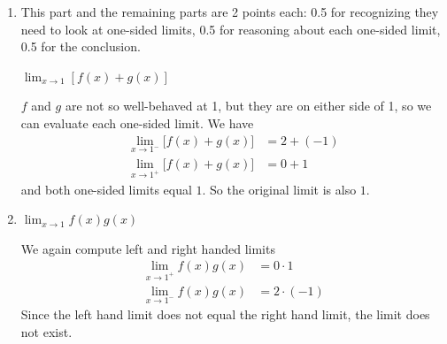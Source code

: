 \documentclass{article}
\begin{document}
\begin{enumerate}
\begin{enumerate}
    \begin{problem}[\vfill]
      $\displaystyle \lim_{x \to 0} [f(x) + g(x)]$
    \end{problem}

    \begin{solution}
      We have $\displaystyle\lim_{x \to 0} f(x) = 2$ and $\displaystyle\lim_{x \to 0} g(x) = 0$, so the sum of these two functions is approaching $\boxed{2}$ as $x$ gets close to $0$. 
    \end{solution}

  \item

    \begin{grading}
      This part and the remaining parts are 2 points each: 0.5 for recognizing they need to look at one-sided limits, 0.5 for reasoning about each one-sided limit, 0.5 for the conclusion.
    \end{grading}

    \begin{problem}[\vfill]
      $\displaystyle \lim_{x \to 1} [f(x) + g(x)]$
    \end{problem}

    \begin{solution}
      $f$ and $g$ are not so well-behaved at 1, but they are on either side of 1, so we can evaluate each one-sided limit. We have 
      \begin{align*}
        \lim_{x \to 1^-} \big[ f(x) + g(x) \big] &= 2 + (-1) \\
        \lim_{x \to 1^+} \big[ f(x) + g(x) \big] &= 0 + 1
      \end{align*} 
      and both one-sided limits equal $1$. So the original limit is also $\boxed{1}$.
    \end{solution}

  \item
    \begin{problem}[\vfill]
      $\displaystyle \lim_{x \to 1} f(x) g(x)$
    \end{problem}

    \begin{solution}
      We again compute left and right handed limits 
      \begin{align*} 
        \lim_{x \rightarrow 1^+} f(x) g(x) &= 0 \cdot 1\\
        \lim_{x \rightarrow 1^-} f(x) g(x) &= 2 \cdot (-1) 
      \end{align*} 
      Since the left hand limit does not equal the right hand limit, the limit does not exist. 
    \end{solution}


\end{enumerate}
\end{enumerate}
\end{document}
